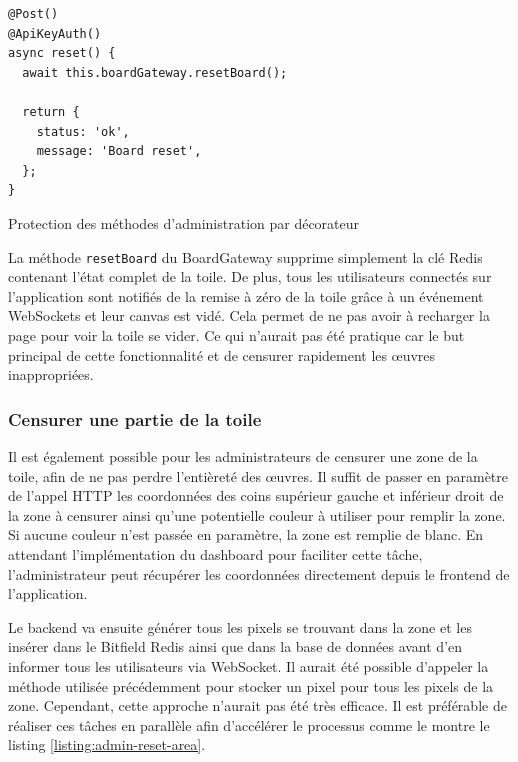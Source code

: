 \begin{listing}[h]
  \begin{verbatim}
@Post()
@ApiKeyAuth()
async reset() {
  await this.boardGateway.resetBoard();

  return {
    status: 'ok',
    message: 'Board reset',
  };
}
\end{verbatim}
  \caption{Protection des méthodes d'administration par décorateur}
  \label{listing:admin-methods-auth}
\end{listing}

La méthode \texttt{resetBoard} du BoardGateway supprime simplement la clé Redis contenant l'état complet de la toile. De plus, tous les utilisateurs connectés sur l'application sont notifiés de la remise à zéro de la toile grâce à un événement WebSockets et leur canvas est vidé. Cela permet de ne pas avoir à recharger la page pour voir la toile se vider. Ce qui n'aurait pas été pratique car le but principal de cette fonctionnalité et de censurer rapidement les \oe{}uvres inappropriées.

\subsubsection{Censurer une partie de la toile}

Il est également possible pour les administrateurs de censurer une zone de la toile, afin de ne pas perdre l'entièreté des \oe{}uvres. Il suffit de passer en paramètre de l'appel HTTP les coordonnées des coins supérieur gauche et inférieur droit de la zone à censurer ainsi qu'une potentielle couleur à utiliser pour remplir la zone. Si aucune couleur n'est passée en paramètre, la zone est remplie de blanc. En attendant l'implémentation du dashboard pour faciliter cette tâche, l'administrateur peut récupérer les coordonnées directement depuis le frontend de l'application.

Le backend va ensuite générer tous les pixels se trouvant dans la zone et les insérer dans le Bitfield Redis ainsi que dans la base de données avant d'en informer tous les utilisateurs via WebSocket. Il aurait été possible d'appeler la méthode utilisée précédemment pour stocker un pixel pour tous les pixels de la zone. Cependant, cette approche n'aurait pas été très efficace. Il est préférable de réaliser ces tâches en parallèle afin d'accélérer le processus comme le montre le listing \ref{listing:admin-reset-area}.

